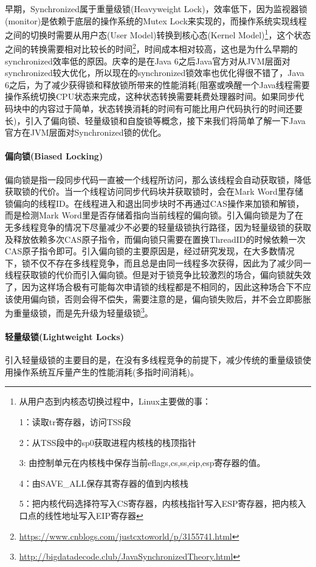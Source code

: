 \documentclass[../../../interview-questions.tex]{subfiles}
\begin{document}
早期，Synchronized属于重量级锁(Heavyweight Lock)，效率低下，因为监视器锁(monitor)是依赖于底层的操作系统的Mutex Lock来实现的，而操作系统实现线程之间的切换时需要从用户态(User Model)转换到核心态(Kernel Model)\footnote{从用户态到内核态切换过程中，Linux主要做的事：

1：读取tr寄存器，访问TSS段

2：从TSS段中的sp0获取进程内核栈的栈顶指针

3:  由控制单元在内核栈中保存当前eflags,cs,ss,eip,esp寄存器的值。

4：由SAVE\_ALL保存其寄存器的值到内核栈

5：把内核代码选择符写入CS寄存器，内核栈指针写入ESP寄存器，把内核入口点的线性地址写入EIP寄存器}，这个状态之间的转换需要相对比较长的时间\footnote{\url{https://www.cnblogs.com/justcxtoworld/p/3155741.html}}，时间成本相对较高，这也是为什么早期的synchronized效率低的原因。庆幸的是在Java 6之后Java官方对从JVM层面对synchronized较大优化，所以现在的synchronized锁效率也优化得很不错了，Java 6之后，为了减少获得锁和释放锁所带来的性能消耗(阻塞或唤醒一个Java线程需要操作系统切换CPU状态来完成，这种状态转换需要耗费处理器时间。如果同步代码块中的内容过于简单，状态转换消耗的时间有可能比用户代码执行的时间还要长)，引入了偏向锁、轻量级锁和自旋锁等概念，接下来我们将简单了解一下Java官方在JVM层面对Synchronized锁的优化。

\paragraph{偏向锁(Biased Locking)}偏向锁是指一段同步代码一直被一个线程所访问，那么该线程会自动获取锁，降低获取锁的代价。当一个线程访问同步代码块并获取锁时，会在Mark Word里存储锁偏向的线程ID。在线程进入和退出同步块时不再通过CAS操作来加锁和解锁，而是检测Mark Word里是否存储着指向当前线程的偏向锁。引入偏向锁是为了在无多线程竞争的情况下尽量减少不必要的轻量级锁执行路径，因为轻量级锁的获取及释放依赖多次CAS原子指令，而偏向锁只需要在置换ThreadID的时候依赖一次CAS原子指令即可。引入偏向锁的主要原因是，经过研究发现，在大多数情况下，锁不仅不存在多线程竞争，而且总是由同一线程多次获得，因此为了减少同一线程获取锁的代价而引入偏向锁。但是对于锁竞争比较激烈的场合，偏向锁就失效了，因为这样场合极有可能每次申请锁的线程都是不相同的，因此这种场合下不应该使用偏向锁，否则会得不偿失，需要注意的是，偏向锁失败后，并不会立即膨胀为重量级锁，而是先升级为轻量级锁\footnote{\url{http://bigdatadecode.club/JavaSynchronizedTheory.html}}。

\paragraph{轻量级锁(Lightweight Locks)}
引入轻量级锁的主要目的是，在没有多线程竞争的前提下，减少传统的重量级锁使用操作系统互斥量产生的性能消耗(多指时间消耗)。
\end{document}
